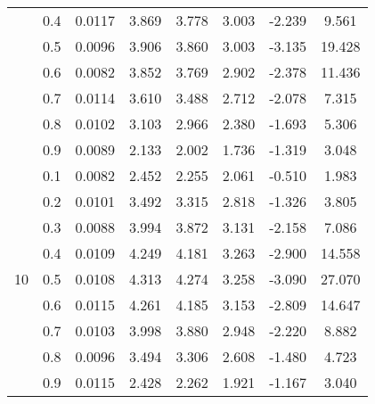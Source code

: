 \documentclass[11pt,a4paper]{report}
\begin{document}
\begin{longtable}{ | c | c || c | c | c | c | c | c | }
 & 0.4 & 0.0117 & 3.869 & 3.778 & 3.003 & -2.239 & 9.561 \\
 & 0.5 & 0.0096 & 3.906 & 3.860 & 3.003 & -3.135 & 19.428 \\
 & 0.6 & 0.0082 & 3.852 & 3.769 & 2.902 & -2.378 & 11.436 \\
 & 0.7 & 0.0114 & 3.610 & 3.488 & 2.712 & -2.078 & 7.315 \\
 & 0.8 & 0.0102 & 3.103 & 2.966 & 2.380 & -1.693 & 5.306 \\
 & 0.9 & 0.0089 & 2.133 & 2.002 & 1.736 & -1.319 & 3.048 \\
 \hline
\multirow{9}{*}{10} & 0.1 & 0.0082 & 2.452 & 2.255 & 2.061 & -0.510 & 1.983 \\
 & 0.2 & 0.0101 & 3.492 & 3.315 & 2.818 & -1.326 & 3.805 \\
 & 0.3 & 0.0088 & 3.994 & 3.872 & 3.131 & -2.158 & 7.086 \\
 & 0.4 & 0.0109 & 4.249 & 4.181 & 3.263 & -2.900 & 14.558 \\
 & 0.5 & 0.0108 & 4.313 & 4.274 & 3.258 & -3.090 & 27.070 \\
 & 0.6 & 0.0115 & 4.261 & 4.185 & 3.153 & -2.809 & 14.647 \\
 & 0.7 & 0.0103 & 3.998 & 3.880 & 2.948 & -2.220 & 8.882 \\
 & 0.8 & 0.0096 & 3.494 & 3.306 & 2.608 & -1.480 & 4.723 \\
 & 0.9 & 0.0115 & 2.428 & 2.262 & 1.921 & -1.167 & 3.040 \\
 \hline
\hline
\end{longtable}
\end{document}
